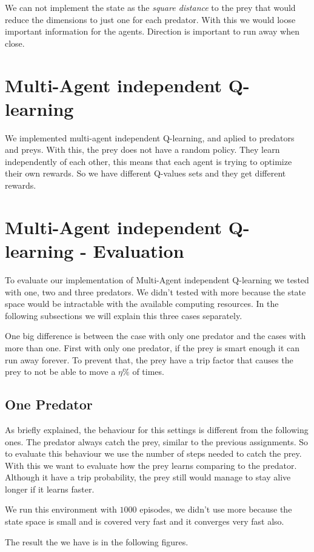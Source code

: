 \documentclass{article}
\begin{document}
We can not implement the state as the \emph{square distance} to the prey that
would reduce the dimensions to just one for each predator. With this we would
loose important information for the agents. Direction is important to run away
when close.

\section{Multi-Agent independent Q-learning}
We implemented multi-agent independent Q-learning, and aplied to predators and
preys. With this, the prey does not have a random policy. They learn
independently of each other, this means that each agent is trying to optimize
their own rewards. So we have different Q-values sets and they get different
rewards.

\section{Multi-Agent independent Q-learning - Evaluation}
To evaluate our implementation of Multi-Agent independent Q-learning we tested
with one, two and three predators. We didn't tested with more because the state
space would be intractable with the available computing resources. In the
following subsections we will explain this three cases separately.

One big difference is between the case with only one predator and the cases with
more than one. First with only one predator, if the prey is smart enough it can
run away forever. To prevent that, the prey have a trip factor that causes the
prey to not be able to move a $\eta\%$ of times.

\subsection{One Predator}
As briefly explained, the behaviour for this settings is different from the
following ones. The predator always catch the prey, similar to the previous
assignments. So to evaluate this behaviour we use the number of steps needed to
catch the prey. With this we want to evaluate how the prey learns comparing to
the predator. Although it have a trip probability, the prey still would manage to
stay alive longer if it learns faster.

We run this environment with $1000$ episodes, we didn't use more because the
state space is small and is covered very fast and it converges very fast also.

The result the we have is in the following figures.
\end{document}
